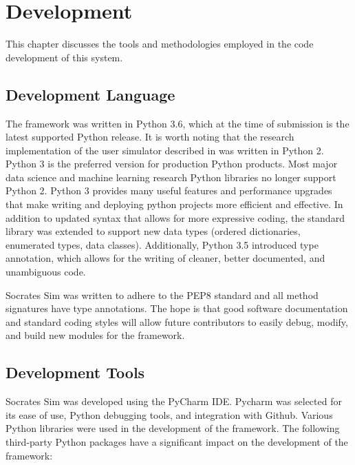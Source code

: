 \chapter{Development}
\label{chap:dev}

This chapter discusses the tools and methodologies employed in the code development of this system. 

\section{Development  Language}

The framework was written in Python 3.6, which at the time of submission is the latest supported Python release. It is worth noting that the research implementation of the user simulator described in \cite{li_usersim} was written in Python 2. Python 3 is the preferred version for production Python products. Most major data science and machine learning research Python libraries no longer support Python 2. Python 3 provides many useful features and performance upgrades that make writing and deploying python projects more efficient and effective. In addition to updated syntax that allows for more expressive coding, the standard library was extended to support new data types (ordered dictionaries, enumerated types, data classes). Additionally, Python 3.5 introduced type annotation, which allows for the writing of cleaner, better documented, and unambiguous code. 

Socrates Sim was written to adhere to the PEP8 standard and all method signatures have type annotations. The hope is that good software documentation and standard coding styles will allow future contributors to easily debug, modify, and build new modules for the framework. 

\section{Development  Tools}

Socrates Sim was developed using the PyCharm IDE. Pycharm was selected for its ease of use, Python debugging tools, and integration with Github. Various Python libraries were used in the development of the framework. The following third-party Python packages have a significant impact on the development of the framework:

